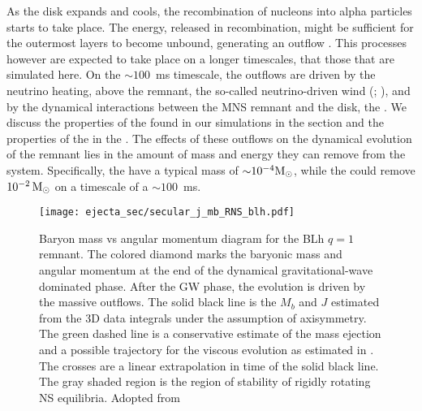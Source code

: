 As the disk expands and cools, the recombination of nucleons into 
alpha particles starts to take place.
The energy, released in recombination, might be sufficient for the outermost 
layers to become unbound, generating an outflow 
\citep{Beloborodov:2008nx,Lee:2009uc,Fernandez:2013tya}.
This processes however are expected to take place on a longer timescales,
that those that are simulated here.
On the $\sim100$~ms timescale, the outflows are driven by the neutrino heating, 
above the remnant, the so-called neutrino-driven wind 
(\nwind; \citealt{Dessart:2008zd,Perego:2014fma,Just:2014fka}),
and by the dynamical interactions between the \ac{MNS} 
remnant and the disk, the \swind{} \citep{Nedora:2019jhl}.
We discuss the properties of the \nwind{} found in our simulations
in the section  and the properties of the 
\swind{} in the .
The effects of these outflows on the dynamical evolution of the remnant 
lies in the amount of mass and energy they can remove from the system.
Specifically, the \nwind{} have a typical mass of ${\sim} 10^{-4}{\text{M}_{\odot}}$, 
while the \swind{} could remove $10^{-2}\,{\text{M}_{\odot}}$ on a timescale of a $\sim100$~ms.

\begin{figure}[t]
    \centering 
    \texttt{[image: ejecta\_sec/secular\_j\_mb\_RNS\_blh.pdf]}
    \caption{Baryon mass vs angular momentum diagram for the BLh $q=1$ remnant.
        The colored diamond marks the baryonic mass and angular momentum at the end
        of the dynamical gravitational-wave dominated phase.
        After the GW phase, the evolution is driven by the massive outflows.
        The solid black line is the $M_b$ and $J$ estimated from the 3D data
        integrals under the assumption of axisymmetry.
        The green dashed line is a conservative estimate
        of the mass ejection and a possible trajectory for the viscous
        evolution as estimated in \citet{Radice:2018xqa}. The crosses are
        a linear extrapolation in time of the solid black line. The gray
        shaded region is the region of stability of rigidly rotating NS equilibria.
        Adopted from \cite{Nedora:2020pak}
    }
    \label{fig:total_j_mb_rns_blh}
\end{figure}

